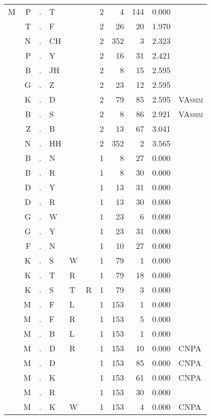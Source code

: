 \begin{longtable}{r@{ } r@{ } c@{ } l@{ } l@{ } l@{ } r r r r l }
M & P & . & T &   &   & 2 & 4 & 144 & 0.000 &  \\
  & T & . & F &   &   & 2 & 26 & 20 & 1.970 &  \\
  & N & . & CH &   &   & 2 & 352 & 3 & 2.323 &  \\
  & P & . & Y &   &   & 2 & 16 & 31 & 2.421 &  \\
  & B & . & JH &   &   & 2 & 8 & 15 & 2.595 &  \\
  & G & . & Z &   &   & 2 & 23 & 12 & 2.595 &  \\
  & K & . & D &   &   & 2 & 79 & 85 & 2.595 & \textsc{VAssim} \\
  & B & . & S &   &   & 2 & 8 & 86 & 2.921 & \textsc{VAssim} \\
  & Z & . & B &   &   & 2 & 13 & 67 & 3.041 &  \\
  & N & . & HH &   &   & 2 & 352 & 2 & 3.565 &  \\
  & B & . & N &   &   & 1 & 8 & 27 & 0.000 &  \\
  & B & . & R &   &   & 1 & 8 & 30 & 0.000 &  \\
  & D & . & Y &   &   & 1 & 13 & 31 & 0.000 &  \\
  & D & . & R &   &   & 1 & 13 & 30 & 0.000 &  \\
  & G & . & W &   &   & 1 & 23 & 6 & 0.000 &  \\
  & G & . & Y &   &   & 1 & 23 & 31 & 0.000 &  \\
  & F & . & N &   &   & 1 & 10 & 27 & 0.000 &  \\
  & K & . & S & W &   & 1 & 79 & 1 & 0.000 &  \\
  & K & . & T & R &   & 1 & 79 & 18 & 0.000 &  \\
  & K & . & S & T & R & 1 & 79 & 3 & 0.000 &  \\
  & M & . & F & L &   & 1 & 153 & 1 & 0.000 &  \\
  & M & . & F & R &   & 1 & 153 & 5 & 0.000 &  \\
  & M & . & B & L &   & 1 & 153 & 1 & 0.000 &  \\
  & M & . & D & R &   & 1 & 153 & 10 & 0.000 & \textsc{CNPA} \\
  & M & . & D &   &   & 1 & 153 & 85 & 0.000 & \textsc{CNPA} \\
  & M & . & K &   &   & 1 & 153 & 61 & 0.000 & \textsc{CNPA} \\
  & M & . & R &   &   & 1 & 153 & 30 & 0.000 &  \\
  & M & . & K & W &   & 1 & 153 & 4 & 0.000 & \textsc{CNPA} \\

\end{longtable}
